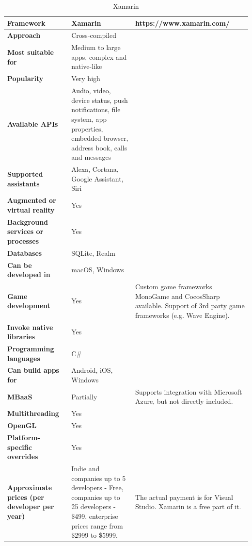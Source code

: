 \documentclass[english,master,public,dept460,male,cpdeclaration,oneside]{diploma}
\begin{document}
\begin{table}[!h]
	\centering
	\caption{Xamarin}
	\begin{tabular}{p{} | p{} | p{}}
		\toprule		
		\textbf{Framework} & \textbf{Xamarin} & https://www.xamarin.com/ \\
		\midrule
		\textbf{Approach} & Cross-compiled & \\			
		\midrule	
		\textbf{Most suitable for} & Medium to large apps, complex and native-like & \\
		\midrule
		\textbf{Popularity} & Very high & \\			
		\midrule
		\textbf{Available APIs} & Audio, video, device status, push notifications, file system, app properties, embedded browser, address book, calls and messages & \\			
		\midrule
		\textbf{Supported assistants} & Alexa, Cortana, Google Assistant, Siri & \\			
		\midrule
		\textbf{Augmented or virtual reality} & Yes & \\			
		\midrule
		\textbf{Background services or processes} & Yes & \\			
		\midrule
		\textbf{Databases} & SQLite, Realm & \\			
		\midrule
		\textbf{Can be developed in} & macOS, Windows &  \\			
		\midrule
		\textbf{Game development} & Yes & Custom game frameworks MonoGame and CocosSharp available. Support of 3rd party game frameworks (e.g. Wave Engine). \\			
		\midrule
		\textbf{Invoke native libraries} & Yes & \\			
		\midrule
		\textbf{Programming languages} & C\# & \\			
		\midrule
		\textbf{Can build apps for} & Android, iOS, Windows & \\			
		\midrule
		\textbf{MBaaS} & Partially & Supports integration with Microsoft Azure, but not directly included. \\			
		\midrule
		\textbf{Multithreading} & Yes & \\			
		\midrule
		\textbf{OpenGL} & Yes & \\			
		\midrule
		\textbf{Platform-specific overrides} & Yes & \\			
		\midrule
		\textbf{Approximate prices (per developer per year)} & Indie and companies up to 5 developers - Free, companies up to 25 developers - \$499, enterprise prices range from \$2999 to \$5999. & The actual payment is for Visual Studio. Xamarin is a free part of it. \\			
		\midrule
	\end{tabular}
\end{table}
\end{document}
